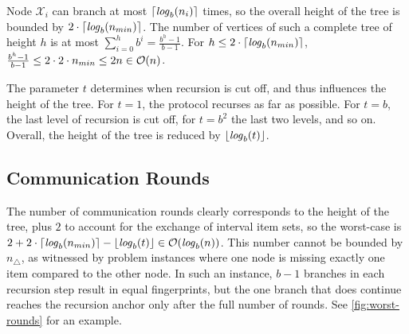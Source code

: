 Node $\mathcal{X}_i$ can branch at most $\lceil\mathit{log}_{b}(n_i)\rceil$ times, so the overall height of the tree is bounded by $2 \cdot\lceil\mathit{log}_{b}(n_{min})\rceil$. The number of vertices of such a complete tree of height $h$ is at most $\sum_{i=0}^{h} b^{i} = \frac{b^{h} - 1}{b - 1}$. For $h \leq 2 \cdot\lceil\mathit{log}_{b}(n_{min})\rceil$, $\frac{b^{h} - 1}{b - 1} \leq 2 \cdot 2 \cdot n_{min} \leq 2n \in \mathcal{O}(n)$.

The parameter $t$ determines when recursion is cut off, and thus influences the height of the tree. For $t = 1$, the protocol recurses as far as possible. For $t = b$, the last level of recursion is cut off, for $t = b^2$ the last two levels, and so on. Overall, the height of the tree is reduced by $\lfloor\mathit{log}_{b}(t)\rfloor$.

\subsection{Communication Rounds}

The number of communication rounds clearly corresponds to the height of the tree, plus $2$ to account for the exchange of interval item sets, so the worst-case is $2 + 2 \cdot\lceil\mathit{log}_{b}(n_{min})\rceil - \lfloor\mathit{log}_{b}(t)\rfloor \in \mathcal{O}(\mathit{log}_{b}(n))$. This number cannot be bounded by $n_{\triangle}$, as witnessed by problem instances where one node is missing exactly one item compared to the other node. In such an instance, $b - 1$ branches in each recursion step result in equal fingerprints, but the one branch that does continue reaches the recursion anchor only after the full number of rounds. See \cref{fig:worst-rounds} for an example.

